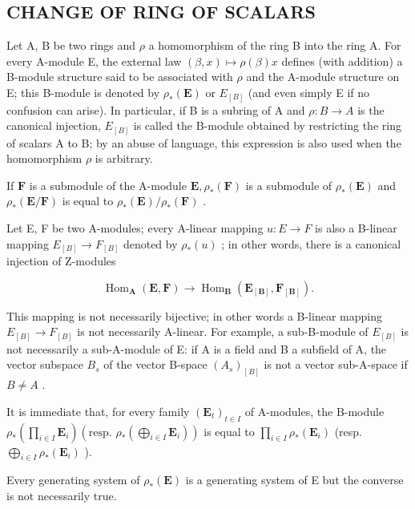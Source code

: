 \subsection{CHANGE OF RING OF SCALARS}

Let A, B be two rings and \(\rho\) a homomorphism of the ring B into the ring A. For every A-module E, the external law \((\beta, x) \mapsto \rho(\beta)x\) defines (with addition) a B-module structure said to be associated with \(\rho\) and the A-module structure on E; this B-module is denoted by \(\rho_{*}(\mathbf{E})\) or \(E_{[B]}\) (and even simply E if no confusion can arise). In particular, if B is a subring of A and \(\rho: B \to A\) is the canonical injection, \(E_{[B]}\) is called the B-module obtained by restricting the ring of scalars A to B; by an abuse of language, this expression is also used when the homomorphism \(\rho\) is arbitrary.

If \(\mathbf{F}\) is a submodule of the A-module \(\mathbf{E},\rho_{*}(\mathbf{F})\) is a submodule of \(\rho_{*}(\mathbf{E})\) and \(\rho_{*}(\mathbf{E} / \mathbf{F})\) is equal to \(\rho_{*}(\mathbf{E}) / \rho_{*}(\mathbf{F})\) .

Let E, F be two A-modules; every A-linear mapping \(u: E \rightarrow F\) is also a B-linear mapping \(E_{[B]} \rightarrow F_{[B]}\) denoted by \(\rho_{*}(u)\) ; in other words, there is a canonical injection of Z-modules

\[
\operatorname{Hom} _ {\mathbf {A}} (\mathbf {E}, \mathbf {F}) \rightarrow \operatorname{Hom} _ {\mathbf {B}} (\mathbf {E} _ {[ \mathbf {B} ]}, \mathbf {F} _ {[ \mathbf {B} ]}).\tag{47}
\]

This mapping is not necessarily bijective; in other words a B-linear mapping \(E_{[B]} \rightarrow F_{[B]}\) is not necessarily A-linear. For example, a sub-B-module of \(E_{[B]}\) is not necessarily a sub-A-module of E: if A is a field and B a subfield of A, the vector subspace \(B_{s}\) of the vector B-space \((A_{s})_{[B]}\) is not a vector sub-A-space if \(B \neq A\) .

It is immediate that, for every family \((\mathbf{E}_t)_{t\in I}\) of A-modules, the B-module \(\rho_{*}\left(\prod_{i\in I}\mathbf{E}_{i}\right)\left(\text{resp. } \rho_{*}\left(\bigoplus_{i\in I}\mathbf{E}_{i}\right)\right)\) is equal to \(\prod_{i\in I}\rho_{*}(\mathbf{E}_{i})\) (resp. \(\bigoplus_{i\in I}\rho_{*}(\mathbf{E}_{i})\) ).

Every generating system of \(\rho_{*}(\mathbf{E})\) is a generating system of E but the converse is not necessarily true.

